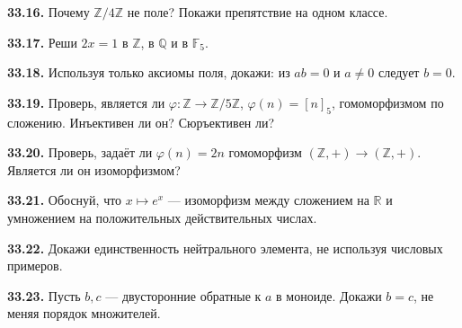 \noindent\begin{minipage}[t]{\linewidth}\textbf{33.16.} Почему \(\mathbb Z/4\mathbb Z\) не поле? Покажи препятствие на одном классе.\par\end{minipage}\par
\noindent\begin{minipage}[t]{\linewidth}\textbf{33.17.} Реши \(2x=1\) в \(\mathbb Z\), в \(\mathbb Q\) и в \(\mathbb F_5\).\par\end{minipage}\par
\noindent\begin{minipage}[t]{\linewidth}\textbf{33.18.} Используя только аксиомы поля, докажи: из \(ab=0\) и \(a\ne0\) следует \(b=0\).\par\end{minipage}\par
\noindent\begin{minipage}[t]{\linewidth}\textbf{33.19.} Проверь, является ли \(\varphi:\mathbb Z\to\mathbb Z/5\mathbb Z\), \(\varphi(n)=[n]_5\), гомоморфизмом по сложению. Инъективен ли он? Сюръективен ли?\par\end{minipage}\par
\noindent\begin{minipage}[t]{\linewidth}\textbf{33.20.} Проверь, задаёт ли \(\varphi(n)=2n\) гомоморфизм \((\mathbb Z,+)\to(\mathbb Z,+)\). Является ли он изоморфизмом?\par\end{minipage}\par
\noindent\begin{minipage}[t]{\linewidth}\textbf{33.21.} Обоснуй, что \(x\mapsto e^x\) — изоморфизм между сложением на \(\mathbb R\) и умножением на положительных действительных числах.\par\end{minipage}\par
\noindent\begin{minipage}[t]{\linewidth}\textbf{33.22.} Докажи единственность нейтрального элемента, не используя числовых примеров.\par\end{minipage}\par
\noindent\begin{minipage}[t]{\linewidth}\textbf{33.23.} Пусть \(b,c\) — двусторонние обратные к \(a\) в моноиде. Докажи \(b=c\), не меняя порядок множителей.\par\end{minipage}\par

